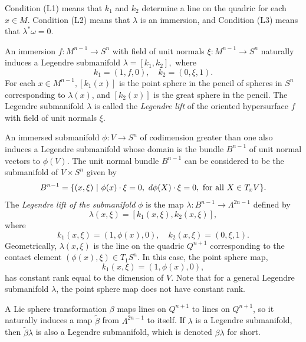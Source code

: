\documentclass[12pt]{article}
\begin{document}
{Condition (L1) means that $k_1$ and $k_2$ determine a line on the
quadric for each $x \in M$.  Condition (L2) means that 
$\lambda$ is an immersion, and Condition (L3) means that 
$\lambda ^* \omega = 0$. 

An immersion $f:M^{n-1} \rightarrow S^n$ with field of unit
normals $\xi :M^{n-1} \rightarrow S^n$ naturally induces
a Legendre submanifold $\lambda = [k_1, k_2],$ where 
\begin{equation}
\label{eq:legendre-parametrization}
k_1 = (1,f,0), \quad k_2 = (0,\xi ,1).
\end{equation}
For each $x \in M^{n-1}, [k_1(x)]$ is the point sphere in the
pencil of spheres in $S^n$ corresponding to $\lambda (x)$, and
$[k_2 (x)]$ is the great sphere in the pencil.  The Legendre submanifold  $\lambda$ is called the
{\em Legendre lift} of the oriented hypersurface $f$ with field of unit normals $\xi$.

An immersed submanifold $\phi :V \rightarrow S^n$ of codimension 
greater than one also induces a Legendre submanifold 
whose domain is the bundle $B^{n-1}$ of unit normal
vectors to $\phi (V)$.  The unit normal bundle $B^{n-1}$ can be considered to be the
submanifold of $V \times S^n$ given by
\begin{equation}
\label{eq:unit-normal-bundle}
B^{n-1} = \{ (x,\xi)\ | \ \phi(x) \cdot \xi = 0, \ d\phi(X) \cdot \xi = 0,\  \mbox{\rm for all }X \in T_xV\}.
\end{equation} 
The {\em Legendre lift of the submanifold}
$\phi$ is the map $\lambda: B^{n-1} \rightarrow \Lambda^{2n-1}$ defined by
\begin{equation}
\label{eq:3.3.2}
\lambda( x,\xi) = [k_1(x,\xi), k_2(x,\xi)],
\end{equation} 
where
\begin{equation}
\label{eq:3.3.3}
k_1(x,\xi) = (1, \phi(x), 0), \quad k_2(x,\xi) = (0, \xi, 1).
\end{equation} 
Geometrically, $\lambda(x,\xi)$ is the line on the quadric $Q^{n+1}$ corresponding to
the contact element $(\phi (x), \xi ) \in T_1S^n$. 
In this case,
the point sphere map, 
\begin{displaymath}
k_1 (x, \xi ) = (1, \phi (x), 0),
\end{displaymath}
has constant rank equal to the dimension of $V$.   Note that 
for a general Legendre submanifold $\lambda$,
the point sphere map does not have constant rank.    

A Lie sphere transformation $\beta$ maps lines on
$Q^{n+1}$ to lines on $Q^{n+1}$, so it naturally
induces a map $\tilde{\beta }$ from 
$\Lambda ^{2n-1}$ to itself.  If $\lambda$ is a
Legendre submanifold, then $\tilde{\beta }\lambda $
is also a Legendre submanifold, which is denoted
$\beta \lambda$ for short.  

}
\end{document}
